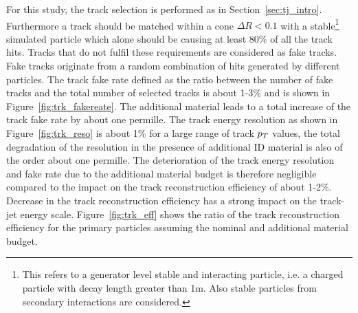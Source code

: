 For this study, the track selection is performed as in Section~\ref{sec:tj_intro}. Furthermore a track should be 
matched within a cone $\Delta R <0.1$ with a stable\footnote{This refers to a generator level stable and interacting particle, i.e.
a charged particle with decay length greater than 1m. Also stable particles from secondary interactions are considered.} 
simulated particle which alone should be causing at least 80\% of all the track hits. Tracks that do not fulfil
these requirements are considered as fake tracks. 
Fake tracks originate from a random combination of hits generated by different particles.
The track fake rate defined as the ratio between the number of fake tracks and the total number of selected tracks  is about 1-3\% and is  
shown in Figure~\ref{fig:trk_fakereate}. The additional material leads to  
a total increase of the track fake rate by about one  permille. The track energy resolution 
as shown in Figure~\ref{fig:trk_reso} is about 1\% for a large range of track $p_{T}$ values, the total 
degradation of the resolution in the presence of additional ID material is also of the order about one  permille. 
The deterioration of the track energy resolution and fake rate due to the additional material budget  is therefore 
negligible compared to  the impact on the track reconstruction efficiency of about 1-2\%.
Decrease in the track reconstruction efficiency has a strong impact on the track-jet energy scale.
Figure~\ref{fig:trk_eff} shows the ratio of the track reconstruction
efficiency for the primary particles assuming the nominal and additional material budget.


